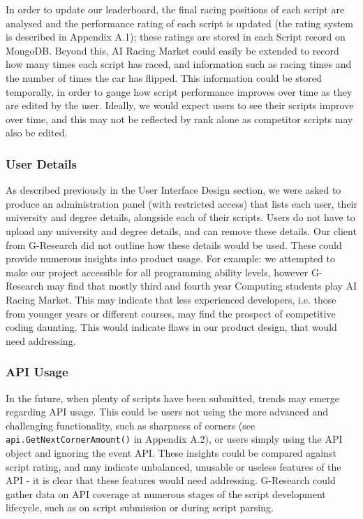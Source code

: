 In order to update our leaderboard, the final racing positions of each script are analysed and the performance rating of each script is updated (the rating system is described in Appendix A.1); these ratings are stored in each Script record on MongoDB. Beyond this, AI Racing Market could easily be extended to record how many times each script has raced, and information such as racing times and the number of times the car has flipped. This information could be stored temporally, in order to gauge how script performance improves over time as they are edited by the user. Ideally, we would expect users to see their scripts improve over time, and this may not be reflected by rank alone as competitor scripts may also be edited. 

\subsubsection{User Details}

As described previously in the User Interface Design section, we were asked to produce an administration panel (with restricted access) that lists each user, their university and degree details, alongside each of their scripts. Users do not have to upload any university and degree details, and can remove these details. Our client from G-Research did not outline how these details would be used. These could provide numerous insights into product usage. For example: we attempted to make our project accessible for all programming ability levels, however G-Research may find that mostly third and fourth year Computing students play AI Racing Market. This may indicate that less experienced developers, i.e. those from younger years or different courses, may find the prospect of competitive coding daunting. This would indicate flaws in our product design, that would need addressing.

\subsubsection{API Usage}

In the future, when plenty of scripts have been submitted, trends may emerge regarding API usage. This could be users not using the more advanced and challenging functionality, such as sharpness of corners (see {\tt api.GetNextCornerAmount()} in Appendix A.2), or users simply using the API object and ignoring the event API. These insights could be compared against script rating, and may indicate unbalanced, unusable or useless features of the API - it is clear that these features would need addressing. G-Research could gather data on API coverage at numerous stages of the script development lifecycle, such as on script submission or during script parsing.


